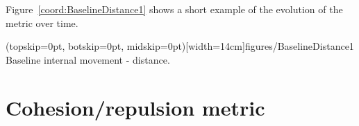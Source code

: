 \documentclass{ieeeaccess}
\begin{document}
Figure~\ref{coord:BaselineDistance1} shows a short example of the evolution 
of the metric over time.

\Figure[t!](topskip=0pt, botskip=0pt,
midskip=0pt)[width=14cm]{figures/BaselineDistance1} {Baseline internal movement
- distance.\label{coord:BaselineDistance1}}


\section{Cohesion/repulsion metric}\label{Section:MagnitudeDynamics}


\end{document}
